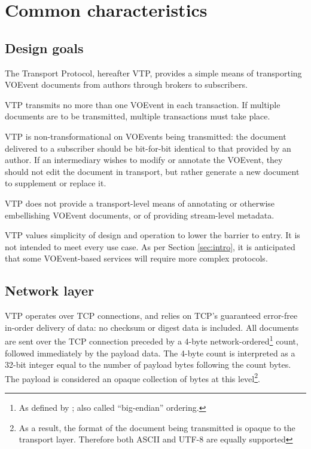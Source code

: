 \documentclass[a4paper,11pt]{ivoa}
\begin{document}
\section{Common characteristics}

\subsection{Design goals}
\label{sec:common:design}

The Transport Protocol, hereafter VTP, provides a simple means of transporting
VOEvent documents from authors through brokers to subscribers.

VTP transmits no more than one VOEvent in each transaction. If multiple
documents are to be transmitted, multiple transactions must take place.

VTP is non-transformational on VOEvents being transmitted: the document
delivered to a subscriber should be bit-for-bit identical to that provided by
an author. If an intermediary wishes to modify or annotate the VOEvent, they
should not edit the document in transport, but rather generate a new document
to supplement or replace it.

VTP does not provide a transport-level means of annotating or otherwise
embellishing VOEvent documents, or of providing stream-level metadata.

VTP values simplicity of design and operation to lower the barrier to entry. It
is not intended to meet every use case. As per Section \ref{sec:intro}, it is
anticipated that some VOEvent-based services will require more complex
protocols.

\subsection{Network layer}

VTP operates over TCP \citep{Cerf:1974} connections, and relies on TCP's
guaranteed error-free in-order delivery of data: no checksum or digest data is
included. All documents are sent over the TCP connection preceded by a 4-byte
network-ordered\footnote{As defined by \citet{Reynolds:1994}; also called
``big-endian'' ordering.} count, followed immediately by the payload data. The
4-byte count is interpreted as a 32-bit integer equal to the number of payload
bytes following the count bytes. The payload is considered an opaque
collection of bytes at this level\footnote{As a result, the format of the
document being transmitted is opaque to the transport layer. Therefore both
ASCII and UTF-8 are equally supported}.
\end{document}
